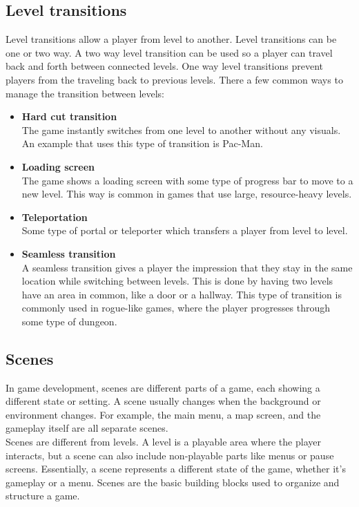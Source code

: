 \documentclass{article} %
\begin{document}
\subsection{Level transitions}
Level transitions allow a player from level to another.
Level transitions can be one or two way.
A two way level transition can be used so a player can travel back and forth between connected levels.
One way level transitions prevent players from the traveling back to previous levels.
There a few common ways to manage the transition between levels:
\begin {itemize}
	\item \textbf{Hard cut transition} \\
		The game instantly switches from one level to another without any visuals.
		An example that uses this type of transition is Pac-Man.
	\item \textbf{Loading screen} \\
		The game shows a loading screen with some type of progress bar to move to a new level.
		This way is common in games that use large, resource-heavy levels.
	\item \textbf{Teleportation} \\
		Some type of portal or teleporter which transfers a player from level to level.
	\item \textbf{Seamless transition} \\
		A seamless transition gives a player the impression that they stay in the same location while switching between levels.
		This is done by having two levels have an area in common, like a door or a hallway.
		This type of transition is commonly used in rogue-like games, where the player progresses through some type of dungeon.
\end{itemize}

\subsection{Scenes}
In game development, scenes are different parts of a game, each showing a different state or setting. 
A scene usually changes when the background or environment changes. 
For example, the main menu, a map screen, and the gameplay itself are all separate scenes.
\\
Scenes are different from levels. 
A level is a playable area where the player interacts, but a scene can also include non-playable parts like menus or pause screens. 
Essentially, a scene represents a different state of the game, whether it’s gameplay or a menu.
Scenes are the basic building blocks used to organize and structure a game.
\end{document}
